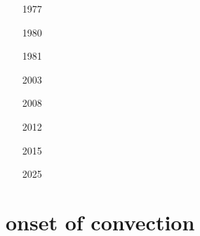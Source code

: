 \begin{small}
\begin{itemize}
\item[1977] 
\item[1980] 
\item[1981] 
\item[2003] 
\item[2008] 
\item[2012] 
\item[2015]  
\item[2025] 
\end{itemize}
\end{small}

\section{onset of convection}

\begin{small}
\begin{itemize}
\item[\nineteensixtynine]
\item[\nineteeneightytwo] 
\item[\nineteenninety] 
\item[\twothousand] 
\item[\twothousandsix] 
\item[\twothousandtwo] 
\item[\twothousandtwo] 
\item[\twothousandseven] 
\item[\twothousandfifteen] 
\end{itemize}
\end{small}







